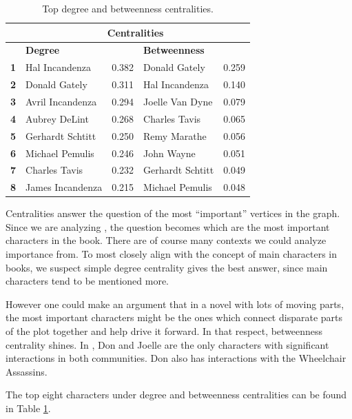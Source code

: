 \begin{table}[]
\begin{tabular}{@{}lllll@{}}
\toprule
 & \multicolumn{4}{c}{\textbf{Centralities}} \\ \midrule
 & \multicolumn{2}{l}{\textbf{Degree}}  & \multicolumn{2}{l}{\textbf{Betweenness}} \\ \midrule
\textbf{1} & Hal Incandenza   & 0.382 & Donald Gately   & 0.259 \\ \midrule
\textbf{2} & Donald Gately    & 0.311 & Hal Incandenza  & 0.140 \\ \midrule
\textbf{3} & Avril Incandenza & 0.294 & Joelle Van Dyne & 0.079 \\ \midrule
\textbf{4} & Aubrey DeLint    & 0.268 & Charles Tavis   & 0.065 \\ \midrule
\textbf{5} & Gerhardt Schtitt & 0.250 & Remy Marathe    & 0.056 \\ \midrule
\textbf{6} & Michael Pemulis  & 0.246 & John Wayne       & 0.051 \\ \midrule
\textbf{7} & Charles Tavis    & 0.232 & Gerhardt Schtitt & 0.049 \\ \midrule
\textbf{8} & James Incandenza & 0.215 & Michael Pemulis  & 0.048 \\ \toprule
\end{tabular}
    \caption{Top degree and betweenness centralities.}
    \label{tab:centralities}

\end{table}

Centralities answer the question of the most ``important'' vertices in the graph. Since we are analyzing \infinitejest, the question becomes which are the most important characters in the book. There are of course many contexts we could analyze importance from. To most closely align with the concept of main characters in books, we suspect simple degree centrality gives the best answer, since main characters tend to be mentioned more. 

However one could make an argument that in a novel with lots of moving parts, the most important characters might be the ones which connect disparate parts of the plot together and help drive it forward. In that respect, betweenness centrality shines. In \infinitejest, Don and Joelle are the only characters with significant interactions in both communities. Don also has interactions with the Wheelchair Assassins.

The top eight characters under degree and betweenness centralities can be found in Table \ref{tab:centralities}.



